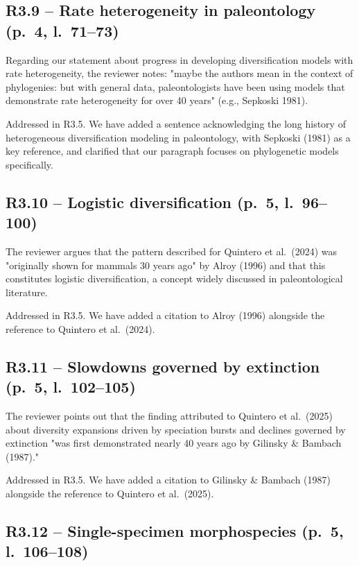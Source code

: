 \documentclass[11pt]{article}
\newcommand{\response}[1]{\noindent\textcolor{resp}{#1}\medskip}
\begin{document}
\subsection*{R3.9 -- Rate heterogeneity in paleontology (p.\ 4, l.\ 71--73)}

Regarding our statement about progress in developing diversification models with rate heterogeneity, the reviewer notes: "maybe the authors mean in the context of phylogenies: but with general data, paleontologists have been using models that demonstrate rate heterogeneity for over 40 years" (e.g., Sepkoski 1981).

\response{Addressed in R3.5. We have added a sentence acknowledging the long history of heterogeneous diversification modeling in paleontology, with Sepkoski (1981) as a key reference, and clarified that our paragraph focuses on phylogenetic models specifically.}

\subsection*{R3.10 -- Logistic diversification (p.\ 5, l.\ 96--100)}

The reviewer argues that the pattern described for Quintero et al.\ (2024) was "originally shown for mammals 30 years ago" by Alroy (1996) and that this constitutes logistic diversification, a concept widely discussed in paleontological literature.

\response{Addressed in R3.5. We have added a citation to Alroy (1996) alongside the reference to Quintero et al.\ (2024).}

\subsection*{R3.11 -- Slowdowns governed by extinction (p.\ 5, l.\ 102--105)}

The reviewer points out that the finding attributed to Quintero et al.\ (2025) about diversity expansions driven by speciation bursts and declines governed by extinction "was first demonstrated nearly 40 years ago by Gilinsky \& Bambach (1987)."

\response{Addressed in R3.5. We have added a citation to Gilinsky \& Bambach (1987) alongside the reference to Quintero et al.\ (2025).}

\subsection*{R3.12 -- Single-specimen morphospecies (p.\ 5, l.\ 106--108)}
\end{document}
